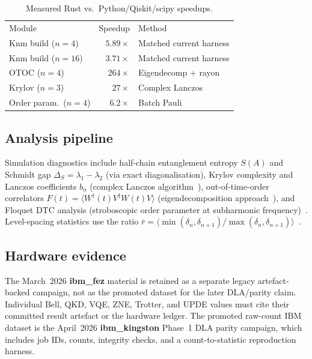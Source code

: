 \documentclass[twocolumn,prl,superscriptaddress,showpacs,floatfix]{revtex4-2}
\begin{document}
\begin{table}[b]
\caption{\label{tab:speedup}%
Measured Rust vs.\ Python/Qiskit/scipy speedups.}
\begin{ruledtabular}
\begin{tabular}{lrl}
Module & Speedup & Method \\
\colrule
Knm build ($n=4$) & $5.89\times$ & Matched current harness \\
Knm build ($n=16$) & $3.71\times$ & Matched current harness \\
OTOC ($n=4$) & $264\times$ & Eigendecomp + rayon \\
Krylov ($n=3$) & $27\times$ & Complex Lanczos \\
Order param.\ ($n=4$) & $6.2\times$ & Batch Pauli \\
\end{tabular}
\end{ruledtabular}
\end{table}

\subsection{Analysis pipeline}

Simulation diagnostics include half-chain entanglement entropy $S(A)$
and Schmidt gap $\Delta_S = \lambda_1 - \lambda_2$ (via exact
diagonalisation), Krylov complexity and Lanczos coefficients $b_n$
(complex Lanczos algorithm~\cite{delCampo2025}), out-of-time-order
correlators $F(t) = \langle W^\dagger(t) V^\dagger W(t) V\rangle$
(eigendecomposition approach~\cite{Maldacena2016}), and Floquet DTC
analysis (stroboscopic order parameter at subharmonic
frequency)~\cite{Else2016}. Level-spacing statistics use the ratio
$\bar{r} = \langle\min(\delta_n, \delta_{n+1}) /
\max(\delta_n, \delta_{n+1})\rangle$~\cite{Oganesyan2007}.

\subsection{Hardware evidence}

The March~2026 \textbf{ibm\_fez} material is retained as a separate
legacy artefact-backed campaign, not as the promoted dataset for the later
DLA/parity claim. Individual Bell, QKD, VQE, ZNE, Trotter, and UPDE
values must cite their committed result artefact or the hardware ledger. The
promoted raw-count IBM dataset is the April~2026 \textbf{ibm\_kingston}
Phase~1 DLA parity campaign, which includes job IDs, counts, integrity checks,
and a count-to-statistic reproduction harness.
\end{document}

